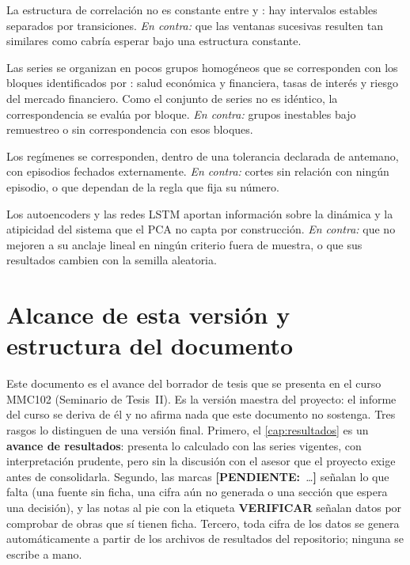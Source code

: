 \begin{description}[style=nextline, leftmargin=1.2em]
  \item[HT1 (no estacionariedad estructural).] La estructura de correlación no es
    constante entre \anioInicioDatos{} y \anioFinDatos{}: hay intervalos estables separados por
    transiciones. \emph{En contra:} que las ventanas sucesivas resulten tan similares como
    cabría esperar bajo una estructura constante.
  \item[HT2 (organización en grupos).] Las series se organizan en pocos grupos
    homogéneos que se corresponden con los bloques identificados por
    \textcite{camiz_cerda_atoche_2026}: salud económica y financiera, tasas de interés y riesgo
    del mercado financiero. Como el conjunto de series no es idéntico, la correspondencia se
    evalúa por bloque. \emph{En contra:} grupos inestables bajo remuestreo o sin
    correspondencia con esos bloques.
  \item[HT3 (correspondencia con episodios).] Los regímenes se corresponden,
    dentro de una tolerancia declarada de antemano, con episodios fechados externamente.
    \emph{En contra:} cortes sin relación con ningún episodio, o que dependan de la regla que
    fija su número.
  \item[HT4 (complementariedad).] Los autoencoders y las redes LSTM aportan
    información sobre la dinámica y la atipicidad del sistema que el PCA no capta por
    construcción. \emph{En contra:} que no mejoren a su anclaje lineal en ningún criterio fuera
    de muestra, o que sus resultados cambien con la semilla aleatoria.
\end{description}

\section{Alcance de esta versión y estructura del documento}
\label{sec:estructura}

Este documento es el avance del borrador de tesis que se presenta en el curso MMC102 (Seminario de
Tesis~II). Es la versión maestra del proyecto: el informe del curso se deriva de él y no afirma
nada que este documento no sostenga. Tres rasgos lo distinguen de una versión final. Primero, el
\cref{cap:resultados} es un \textbf{avance de resultados}: presenta lo calculado con las
\nSeries{} series vigentes, con interpretación prudente, pero sin la discusión con el asesor que
el proyecto exige antes de consolidarla. Segundo, las marcas \textcolor{red!75!black}{\textbf{[PENDIENTE:}~\textit{\dots}\textbf{]}} señalan lo que falta
(una fuente sin ficha, una cifra aún no generada o una sección que espera una decisión), y las
notas al pie con la etiqueta \textcolor{orange!70!black}{\textbf{VERIFICAR}} señalan datos por
comprobar de obras que sí tienen ficha. Tercero, toda cifra de los datos se genera
automáticamente a partir de los archivos de resultados del repositorio; ninguna se escribe a mano.

